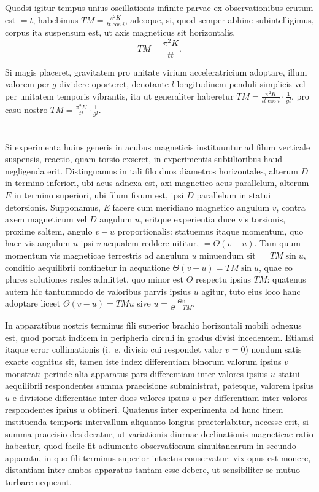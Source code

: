 \documentclass[fontsize=11pt,paper=a4,twoside,openany]{scrbook}
\begin{document}
Quodsi igitur tempus unius oscillationis infinite parvae ex observationibus erutum est $=t$, habebimus $TM=\frac{\pi^2 K}{tt\cos i}$, adeoque, si, quod semper abhinc subintelligimus, corpus ita suspensum est, ut axis magneticus sit horizontalis,
\[
TM = \frac{\pi^2 K}{tt}.
\]

Si magis placeret, gravitatem pro unitate virium acceleratricium adoptare, illum valorem per $g$ dividere oporteret, denotante $l$ longitudinem penduli simplicis vel per unitatem temporis vibrantis, ita ut generaliter haberetur $TM=\frac{\pi^2 K}{tt\cos i}\cdot\frac{1}{gl}$, pro casu nostro $TM=\frac{\pi^2 K}{tt}\cdot\frac{1}{gl}$.

\section{}

Si experimenta huius generis in acubus magneticis instituuntur ad filum verticale suspensis, reactio, quam torsio exseret, in experimentis subtilioribus haud negligenda erit. Distinguamus in tali filo duos diametros horizontales, alterum $D$ in termino inferiori, ubi acus adnexa est, axi magnetico acus parallelum, alterum $E$ in termino superiori, ubi filum fixum est, ipsi $D$ parallelum in statui detorsionis. Supponamus, $E$ facere cum meridiano magnetico angulum $v$, contra axem magneticum vel $D$ angulum $u$, eritque experientia duce vis torsionis, proxime saltem, angulo $v-u$ proportionalis: statuemus itaque momentum, quo haec vis angulum $u$ ipsi $v$ aequalem reddere nititur, $=\Theta(v-u)$. Tam quum momentum vis magneticae terrestris ad angulum $u$ minuendum sit $=TM\sin u$, conditio aequilibrii continetur in aequatione $\Theta(v-u)=TM\sin u$, quae eo plures solutiones reales admittet, quo minor est $\Theta$ respectu ipsius $TM$: quatenus autem hic tantummodo de valoribus parvis ipsius $u$ agitur, tuto eius loco hanc adoptare liceet $\Theta(v-u)=TMu$
sive $u=\frac{\Theta v}{\Theta+TM}$.

In apparatibus nostris terminus fili superior brachio horizontali mobili adnexus est, quod portat indicem in peripheria circuli in gradus divisi incedentem. Etiamsi itaque error collimationis (i.~e. divisio cui respondet valor $v=0$) nondum satis exacte cognitus sit, tamen iste index differentiam binorum valorum ipsius $v$ monstrat: perinde alia apparatus pars differentiam inter valores ipsius $u$ statui aequilibrii respondentes summa praecisione subministrat, patetque, valorem ipsius $u$ e divisione differentiae inter duos valores ipsius $v$ per differentiam inter valores respondentes ipsius $u$ obtineri. Quatenus inter experimenta ad hunc finem instituenda temporis intervallum aliquanto longius praeterlabitur, necesse erit, si summa praecisio desideratur, ut variationis diurnae declinationis magneticae ratio habeatur, quod facile fit adiumento observationum simultanearum in secundo apparatu, in quo fili terminus superior intactus conservatur: vix opus est monere, distantiam inter ambos apparatus tantam esse debere, ut sensibiliter se mutuo turbare nequeant.
\end{document}
